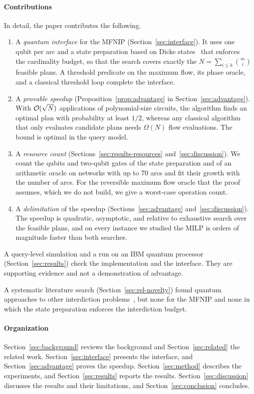 \paragraph{Contributions} In detail, the paper contributes the following.
\begin{enumerate}
\item[C1.] A \emph{quantum interface} for the MFNIP (Section~\ref{sec:interface}). It uses one qubit per arc and a state preparation based on Dicke states~\cite{bartschi2019} that enforces the cardinality budget, so that the search covers exactly the $N=\sum_{i\le k}\binom{m}{i}$ feasible plans. A threshold predicate on the maximum flow, its phase oracle, and a classical threshold loop complete the interface.
\item[C2.] A \emph{provable speedup} (Proposition~\ref{prop:advantage} in Section~\ref{sec:advantage}). With $\mathcal{O}(\sqrt{N})$ applications of polynomial-size circuits, the algorithm finds an optimal plan with probability at least $1/2$, whereas any classical algorithm that only evaluates candidate plans needs $\Omega(N)$ flow evaluations. The bound is optimal in the query model.
\item[C3.] A \emph{resource count} (Sections~\ref{sec:results-resources} and~\ref{sec:discussion}). We count the qubits and two-qubit gates of the state preparation and of an arithmetic oracle on networks with up to 70 arcs and fit their growth with the number of arcs. For the reversible maximum flow oracle that the proof assumes, which we do not build, we give a worst-case operation count.
\item[C4.] A \emph{delimitation} of the speedup (Sections~\ref{sec:advantage} and~\ref{sec:discussion}). The speedup is quadratic, asymptotic, and relative to exhaustive search over the feasible plans, and on every instance we studied the MILP is orders of magnitude faster than both searches.
\end{enumerate}
A query-level simulation and a run on an IBM quantum processor (Section~\ref{sec:results}) check the implementation and the interface. They are supporting evidence and not a demonstration of advantage.

A systematic literature search (Section~\ref{sec:rel-novelty}) found quantum approaches to other interdiction problems~\cite{peddireddy2026,sutcliffe2026}, but none for the MFNIP and none in which the state preparation enforces the interdiction budget.

\paragraph{Organization} Section~\ref{sec:background} reviews the background and Section~\ref{sec:related} the related work. Section~\ref{sec:interface} presents the interface, and Section~\ref{sec:advantage} proves the speedup. Section~\ref{sec:method} describes the experiments, and Section~\ref{sec:results} reports the results. Section~\ref{sec:discussion} discusses the results and their limitations, and Section~\ref{sec:conclusion} concludes.
